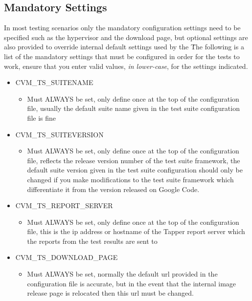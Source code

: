 \subsection{Mandatory Settings}
\label{sec:mandatorysettings}

In most testing scenarios only the mandatory configuration settings need to be specified such as the hypervisor and 
the download page, but optional settings are also provided to override internal default settings used by the 
\cernvmtestframework\. The following is a list of the mandatory settings that must be configured in order for the
tests to work, ensure that you enter valid values, \emph{in lower-case}, for the settings indicated.




\begin{itemize}
\item	CVM\_TS\_SUITENAME
		\begin{itemize}
		\item	Must ALWAYS be set, only define once at the top of the configuration file, 
	  		  	usually the default suite name given in the test suite configuration file is fine
		\end{itemize}
	  		  
\item	CVM\_TS\_SUITEVERSION
		\begin{itemize}
		\item	Must ALWAYS be set, only define once at the top of the configuration file,
	  		  	reflects the release version number of the test suite framework, the default 
      		  	suite version given in the test suite configuration should only be changed if 
     		  	you make modifications to the test suite framework which differentiate it from
      		  	the version released on Google Code.
		\end{itemize}

\item	CVM\_TS\_REPORT\_SERVER
		\begin{itemize}
		\item	Must ALWAYS be set, only define once at the top of the configuration file,
      			this is the ip address or hostname of the Tapper report server which the reports
      			from the test results are sent to
		\end{itemize}
		
\item	CVM\_TS\_DOWNLOAD\_PAGE
		\begin{itemize}
		\item	Must ALWAYS be set, normally the default url provided in the configuration file is
				accurate, but in the event that the internal \cernvm image release page is relocated
				then this url must be changed.
		\end{itemize}


\end{itemize}
